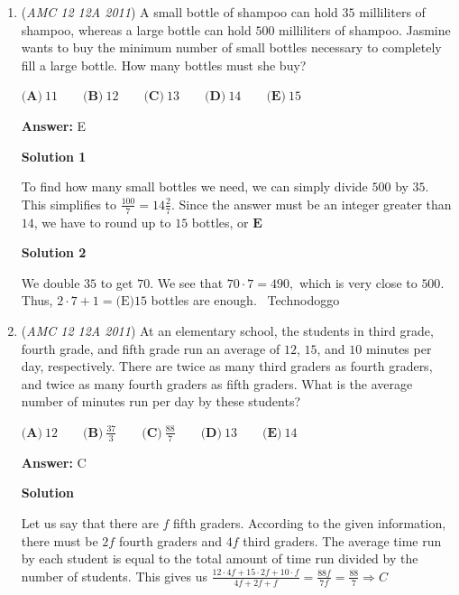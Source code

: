 \begin{enumerate}
By careful inspection and common sense, the answer is $\textbf{(E)}$.

 \textbf{Note} Note that this image is quite similar to a topological map. This means that the coin that appears closest to us is at the top and the coin that appears farthest from us is at the bottom.

 


	\item (\textit{AMC 12 12A 2011}) A small bottle of shampoo can hold $35$ milliliters of shampoo, whereas a large bottle can hold $500$ milliliters of shampoo. Jasmine wants to buy the minimum number of small bottles necessary to completely fill a large bottle. How many bottles must she buy?


 $\textbf{(A)}\ 11 \qquad \textbf{(B)}\ 12 \qquad \textbf{(C)}\ 13 \qquad \textbf{(D)}\ 14 \qquad \textbf{(E)}\ 15$

 \textbf{Answer: }E



\textbf{Solution 1}

To find how many small bottles we need, we can simply divide $500$ by $35$. This simplifies to $\frac{100}{7}=14 \frac{2}{7}.$ Since the answer must be an integer greater than $14$, we have to round up to $15$ bottles, or $\boxed{\textbf{E}}$




\textbf{Solution 2}

We double $35$ to get $70.$ We see that $70\cdot7=490,$ which is very close to $500.$ Thus, $2\cdot7+1=\boxed{\text{(E)} 15}$ bottles are enough. ~Technodoggo

 


	\item (\textit{AMC 12 12A 2011}) At an elementary school, the students in third grade, fourth grade, and fifth grade run an average of $12$, $15$, and $10$ minutes per day, respectively. There are twice as many third graders as fourth graders, and twice as many fourth graders as fifth graders. What is the average number of minutes run per day by these students?


 $\textbf{(A)}\ 12 \qquad \textbf{(B)}\ \frac{37}{3} \qquad \textbf{(C)}\ \frac{88}{7} \qquad \textbf{(D)}\ 13 \qquad \textbf{(E)}\ 14$

 \textbf{Answer: }C



\textbf{Solution}

Let us say that there are $f$ fifth graders. According to the given information, there must be $2f$ fourth graders and $4f$ third graders. The average time run by each student is equal to the total amount of time run divided by the number of students. This gives us $\frac{12\cdot 4f + 15\cdot 2f + 10\cdot f}{4f + 2f + f} = \frac{88f}{7f} = \frac{88}{7} \Rightarrow \boxed{C}$


\end{enumerate}
